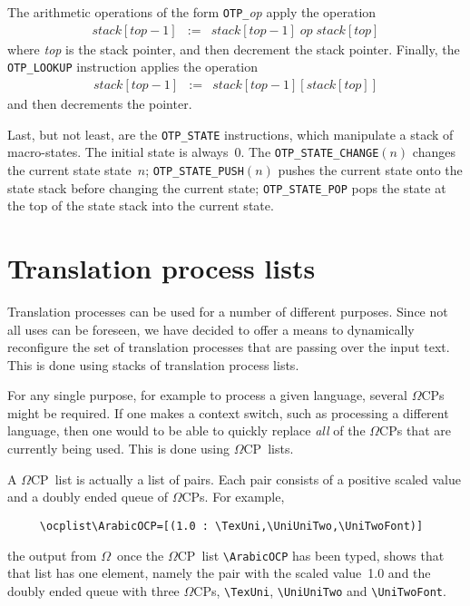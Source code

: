 \documentclass[fleqn]{article}
\newcommand{\OMEGA}{$\Omega$}
\newcommand{\OCP}{\OMEGA CP}
\begin{document}
The arithmetic operations of the form \verb|OTP_|\emph{op} apply the
operation 
\begin{eqnarray*}
\mathit{stack}[\mathit{top}-1] & := & 
\mathit{stack}[\mathit{top}-1] \; \mathit{op} \;
\mathit{stack}[\mathit{top}]
\end{eqnarray*}
where \emph{top} is the stack pointer, and then decrement the stack
pointer.  Finally, the \verb|OTP_LOOKUP| instruction applies the
operation
\begin{eqnarray*}
\mathit{stack}[\mathit{top}-1] & := & 
\mathit{stack}[\mathit{top}-1][\mathit{stack}[\mathit{top}]]
\end{eqnarray*}
and then decrements the pointer.

Last, but not least, are the \verb|OTP_STATE| instructions, which
manipulate a stack of macro-states.  The initial state is always~0.
The \verb|OTP_STATE_CHANGE|$(n)$ changes the current state 
state~$n$; \verb|OTP_STATE_PUSH|$(n)$ pushes the current state onto
the state stack before changing the current state;
\verb|OTP_STATE_POP| pops the state at the top of the state stack into
the current state.

\section{Translation process lists}

Translation processes can be used for a number of different purposes.
Since not all uses can be foreseen, we have decided to offer a means
to dynamically reconfigure the set of translation processes that are
passing over the input text.  This is done using stacks of translation
process lists.

For any single purpose, for example to process a given language,
several \OCP s might be required.  If one makes a context switch,
such as processing a different language, then one would to be able
to quickly replace \emph{all} of the \OCP s that are currently being
used.  This is done using \OCP\ lists.

A \OCP\ list is actually a list of pairs.  Each pair consists of a
positive scaled value and a doubly ended queue of \OCP s.  For
example,
\begin{verbatim}
     \ocplist\ArabicOCP=[(1.0 : \TexUni,\UniUniTwo,\UniTwoFont)]
\end{verbatim}
the output from \OMEGA\ once the \OCP\ list \verb|\ArabicOCP| has
been typed, shows that that list has one element, namely the pair
with the scaled value~1.0 and the doubly ended queue with three
\OCP s, \verb|\TexUni|, \verb|\UniUniTwo| and \verb|\UniTwoFont|.
\end{document}
